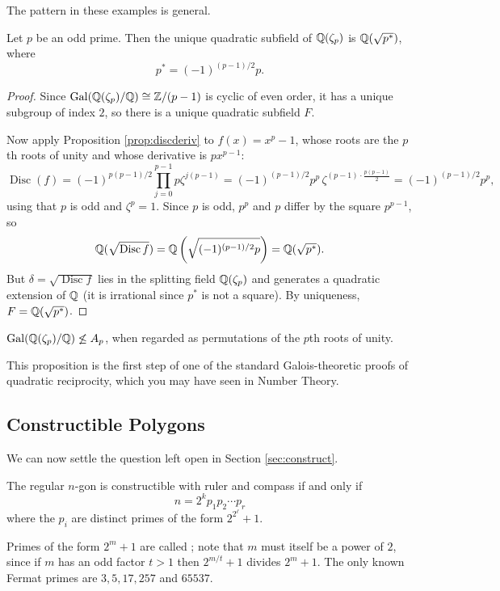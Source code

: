 \documentclass[a4paper]{scrartcl}
\newcommand{\Gal}{\operatorname{Gal}}
\newcommand{\Disc}{\operatorname{Disc}}
\begin{document}
The pattern in these examples is general.

\begin{proposition}\label{prop:quadsubfield}
	Let $p$ be an odd prime. Then the unique quadratic subfield of $\mathbb{Q}(\zeta_p)$ is $\mathbb{Q}(\sqrt{p^*})$, where
	$$p^* = (-1)^{(p-1)/2}p.$$
\end{proposition}

\begin{proof}
	Since $\Gal(\Q(\zeta_p)/\Q)\cong \Z/(p-1)$ is cyclic of even order, it has a unique subgroup of index $2$, so there is a unique quadratic subfield $F$.

	Now apply Proposition \ref{prop:discderiv} to $f(x) = x^p-1$, whose roots are the $p$th roots of unity and whose derivative is $px^{p-1}$:
	$$\Disc(f) = (-1)^{p(p-1)/2}\prod_{j=0}^{p-1}p\zeta^{j(p-1)} = (-1)^{(p-1)/2}p^p\,\zeta^{(p-1)\cdot\frac{p(p-1)}{2}} = (-1)^{(p-1)/2}p^p,$$
	using that $p$ is odd and $\zeta^{p} = 1$. Since $p$ is odd, $p^p$ and $p$ differ by the square $p^{p-1}$, so
	$$\Q(\sqrt{\Disc f}) = \Q\left(\sqrt{(-1)^{(p-1)/2}p}\right) = \Q(\sqrt{p^*}).$$
	But $\delta = \sqrt{\Disc f}$ lies in the splitting field $\mathbb{Q}(\zeta_p)$ and generates a quadratic extension of $\mathbb{Q}$ (it is irrational since $p^*$ is not a square). By uniqueness, $F = \mathbb{Q}(\sqrt{p^*})$.
\end{proof}

\begin{corollary}
	$\Gal(\Q(\zeta_p)/\Q) \not\leq A_p$, when regarded as permutations of the $p$th roots of unity.
\end{corollary}

This proposition is the first step of one of the standard Galois-theoretic proofs of quadratic reciprocity, which you may have seen in Number Theory.

\subsection{Constructible Polygons}

We can now settle the question left open in Section \ref{sec:construct}.

\begin{theorem}[Gauss]\label{thm:gausspoly}
	The regular $n$-gon is constructible with ruler and compass if and only if
	$$n = 2^k p_1p_2\cdots p_r$$
	where the $p_i$ are distinct primes of the form $2^{2^\ell}+1$.
\end{theorem}

Primes of the form $2^m+1$ are called ; note that $m$ must itself be a power of $2$, since if $m$ has an odd factor $t>1$ then $2^{m/t}+1$ divides $2^m+1$. The only known Fermat primes are $3, 5, 17, 257$ and $65537$.
\end{document}
